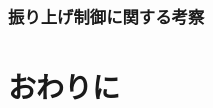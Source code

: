 \documentclass[a4j,11pt,twoside]{jbook}
\begin{document}
\subsection{振り上げ制御に関する考察}



\chapter{おわりに}





\end{document}
